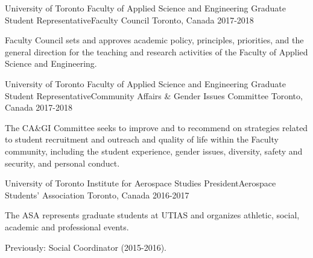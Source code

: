 

\begin{cventries}

  \cventry
    {University of Toronto Faculty of Applied Science and Engineering} %
    {Graduate Student Representative{\enskip\cdotp\enskip}Faculty Council} %
    {Toronto, Canada} %
    {2017-2018} %
    {
      \begin{cvitems} %
        \item {Faculty Council sets and approves academic policy, principles, priorities, and the general direction for the teaching and research activities of the Faculty of Applied Science and Engineering.}
      \end{cvitems}
    }

  \cventry
    {University of Toronto Faculty of Applied Science and Engineering} %
    {Graduate Student Representative{\enskip\cdotp\enskip}Community Affairs \& Gender Issues Committee} %
    {Toronto, Canada} %
    {2017-2018} %
    {
      \begin{cvitems} %
        \item {The CA\&GI Committee seeks to improve and to recommend on strategies related to student recruitment and outreach and quality of life within the Faculty community, including the student experience, gender issues, diversity, safety and security, and personal conduct.}
      \end{cvitems}
    }

  \cventry
    {University of Toronto Institute for Aerospace Studies} %
    {President{\enskip\cdotp\enskip}Aerospace Students' Association} %
    {Toronto, Canada} %
    {2016-2017} %
    {
      \begin{cvitems} %
        \item {The ASA represents graduate students at UTIAS and organizes athletic, social, academic and professional events.}
        \item{Previously: Social Coordinator (2015-2016).}
      \end{cvitems}
    }
  

\end{cventries}
